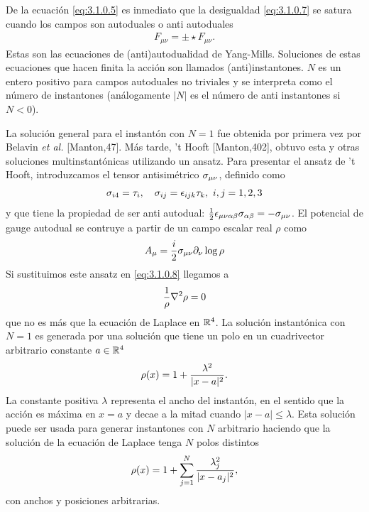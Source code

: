 De la ecuación \eqref{eq:3.1.0.5} es inmediato que la desigualdad \eqref{eq:3.1.0.7} se satura cuando los campos son autoduales o anti autoduales
\begin{align}
	F_{\mu\nu} = \pm\star F_{\mu\nu}. \label{eq:3.1.0.8}
\end{align}
Estas son las ecuaciones de (anti)autodualidad de Yang-Mills. Soluciones de estas ecuaciones que hacen finita la acción son llamados (anti)instantones. $N$ es un entero positivo para campos autoduales no triviales y se interpreta como el número de instantones (análogamente $|N|$ es el número de anti instantones si $N<0$).

La solución general para el instantón con $N=1$ fue obtenida por primera vez por Belavin \emph{et al.} [Manton,47]. Más tarde, 't Hooft [Manton,402], obtuvo esta y otras soluciones multinstantónicas utilizando un ansatz. Para presentar el ansatz de 't Hooft, introduzcamos el tensor antisimétrico $\sigma_{\mu\nu}$, definido como
\begin{align}
	\sigma_{i4}=\tau_i, \ \ \ \sigma_{ij}=\epsilon_{ijk}\tau_k, \ i,j=1,2,3 \label{eq:3.1.0.9}
\end{align}
y que tiene la propiedad de ser anti autodual: $\frac{1}{2}\epsilon_{\mu\nu\alpha\beta}\sigma_{\alpha\beta}=-\sigma_{\mu\nu}$. El potencial de gauge autodual se contruye a partir de un campo escalar real $\rho$ como
\begin{align}
	A_\mu = \frac{i}{2}\sigma_{\mu\nu}\partial_\nu\log\rho \label{eq:3.1.0.10}
\end{align}
Si sustituimos este ansatz en \eqref{eq:3.1.0.8} llegamos a 
\begin{align}
	\frac{1}{\rho}\nabla^2\rho=0 \label{eq:3.1.0.11}
\end{align}
que no es más que la ecuación de Laplace en $\mathbb{R}^4$. La solución instantónica con $N=1$ es generada por una solución que tiene un polo en un cuadrivector arbitrario constante $a\in\mathbb{R}^4$
\begin{align}
	\rho(x) = 1+\frac{\lambda^2}{|x-a|^2}. \label{eq:3.1.0.12}
\end{align}
La constante positiva $\lambda$ representa el ancho del instantón, en el sentido que la acción es máxima en $x=a$ y decae a la mitad cuando $|x-a|\leq\lambda$. Esta solución puede ser usada para generar instantones con $N$ arbitrario haciendo que la solución de la ecuación de Laplace tenga $N$ polos distintos
\begin{align}
	\rho(x) = 1+\sum_{j=1}^N\frac{\lambda_j^2}{|x-a_j|^2},
\end{align}
con anchos y posiciones arbitrarias.

